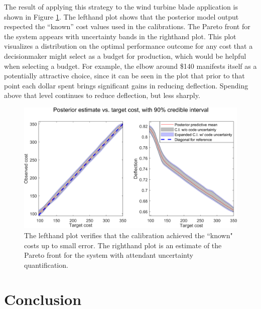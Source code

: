 \documentclass{article}
\begin{document}
%
The result of applying this strategy to the wind turbine blade application is shown in Figure \ref{fig:known_cost}. 
%
The lefthand plot shows that the posterior model output respected the ``known'' cost values used in the calibrations.
%
The Pareto front for the system appears with uncertainty bands in the righthand plot.
%
This plot visualizes a distribution on the optimal performance outcome for any cost that a decisionmaker might select as a budget for production, which would be helpful when selecting a budget.
%
For example, the elbow around \$140 manifests itself as a potentially attractive choice, since it can be seen in the plot that prior to that point each dollar spent brings significant gains in reducing deflection.
%
Spending above that level continues to reduce deflection, but less sharply.


\begin{figure}
\centering
\includegraphics[width=.8\linewidth]{FIG_cost_grid_pareto_bands}
\captionsetup{width=.8\linewidth}
\caption{The lefthand plot verifies that the calibration achieved the ``known" costs up to small error. The righthand plot is an estimate of the Pareto front for the system with attendant uncertainty quantification.}
\label{fig:known_cost}
\end{figure}




\section{Conclusion} \label{conclusion}
\end{document}
